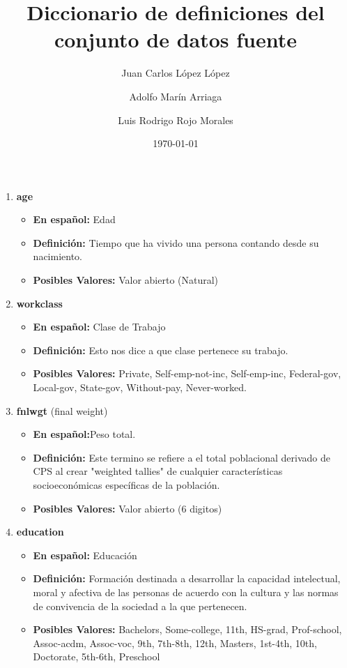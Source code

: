 \documentclass{article}
\title{Diccionario	de	definiciones	del	conjunto	de	datos	fuente}
\author{Juan Carlos López López \and Adolfo Marín Arriaga \and Luis Rodrigo Rojo Morales}
\date{\today\\}
\begin{document}
 \maketitle
 \begin{enumerate}
   \item \textbf{age}
     \begin{itemize}
       \item \textbf{En español:} Edad
       \item \textbf{Definición:} Tiempo que ha vivido una persona contando desde su nacimiento.
       \item \textbf{Posibles Valores:} Valor abierto (Natural)
     \end{itemize}
   \item \textbf{workclass}
     \begin{itemize}
       \item \textbf{En español:} Clase de Trabajo
       \item \textbf{Definición:} Esto nos dice a que clase pertenece su trabajo.
       \item \textbf{Posibles Valores:} Private, Self-emp-not-inc, Self-emp-inc, Federal-gov, Local-gov, State-gov, Without-pay, Never-worked.
     \end{itemize}
    \item \textbf{fnlwgt} (final weight)
    \begin{itemize}
       \item \textbf{En español:}Peso total.
       \item \textbf{Definición:} Este termino se refiere a el total poblacional derivado de CPS al crear "weighted tallies" de cualquier características socioeconómicas específicas de la población.
       \item \textbf{Posibles Valores:} Valor abierto (6 digitos)
    \end{itemize}
    \item \textbf{education}
     \begin{itemize}
       \item \textbf{En español:} Educación
       \item \textbf{Definición:} Formación destinada a desarrollar la capacidad intelectual, moral y afectiva de las personas de acuerdo con la cultura y las normas de convivencia de la sociedad a la que pertenecen.
       \item \textbf{Posibles Valores:}  Bachelors, Some-college, 11th, HS-grad, Prof-school, Assoc-acdm, Assoc-voc, 9th, 7th-8th, 12th, Masters, 1st-4th, 10th, Doctorate, 5th-6th, Preschool

\end{itemize}
\end{enumerate}
\end{document}
